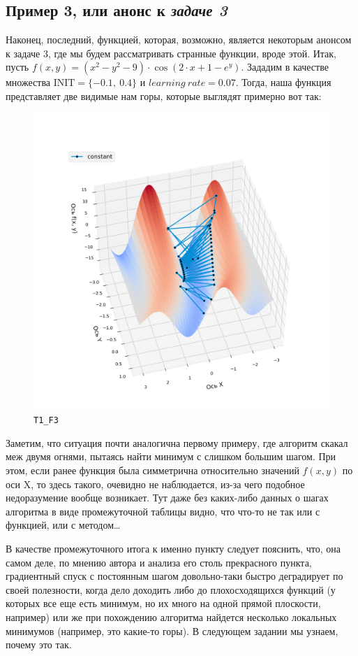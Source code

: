 \documentclass[12pt, a4paper, oneside, final]{article}
\begin{document}
	\subsection*{Пример 3, или анонс к \textit{задаче 3}}
	Наконец, последний, функцией, которая, возможно, является некоторым анонсом к задаче 3, где мы будем рассматривать странные функции, вроде этой. Итак, пусть $f(x, y) = (x^{2} - y^{2} - 9) \cdot \cos(2 \cdot x + 1 - e^{y})$. Зададим в качестве множества $\text{INIT} = \{-0.1, ~ 0.4\}$ и $learning~rate = 0.07$. Тогда, наша функция представляет две видимые нам горы, которые выглядят примерно вот так:
	\begin{figure}[H]
		\centering
		\includegraphics[scale=0.68]{Image/T1_F3.png}
		\caption*{\texttt{T1\_F3}}
	\end{figure}
	Заметим, что ситуация почти аналогична первому примеру, где алгоритм скакал меж двумя огнями, пытаясь найти минимум с слишком большим шагом. При этом, если ранее функция была симметрична относительно значений $f(x, y)$ по оси X, то здесь такого, очевидно не наблюдается, из-за чего подобное недоразумение вообще возникает. Тут даже без каких-либо данных о шагах алгоритма в виде промежуточной таблицы видно, что что-то не так или с функцией, или с методом\ldots

	В качестве промежуточного итога к именно пункту следует пояснить, что, она самом деле, по мнению автора и анализа его столь прекрасного пункта, градиентный спуск с постоянным шагом довольно-таки быстро деградирует по своей полезности, когда дело доходить либо до плохосходящихся функций (у которых все еще есть минимум, но их много на одной прямой плоскости, например) или же при похождению алгоритма найдется несколько локальных минимумов (например, это какие-то горы). В следующем задании мы узнаем, почему это так.
	\newpage
\end{document}
